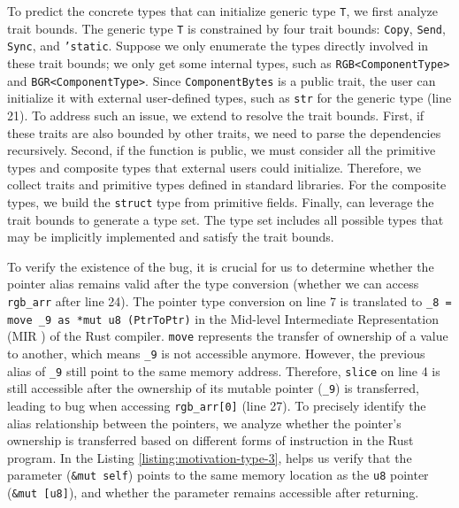 \vspace{0.05in}
 \label{motiv:generic-analysis}
{To predict the concrete types that can initialize generic type \texttt{T}, we first analyze trait bounds. The generic type \texttt{T}} is constrained by four trait bounds: \texttt{Copy}, \texttt{Send}, \texttt{Sync}, and \texttt{'static}.
Suppose we only enumerate the types directly involved in these trait bounds; we only get some internal types, such as \texttt{RGB<ComponentType>} and \texttt{BGR<ComponentType>}.
Since \texttt{ComponentBytes} is a public trait, the user can initialize it with external user-defined types, such as \texttt{str} for the generic type (line 21). 
To address such an issue, we extend {\it \analysisone} to {resolve the trait bounds}.
First, if these traits are also bounded by other traits, we need to parse the dependencies recursively.
Second, if the function is public,
we must consider all the primitive types and composite types that external users could
initialize. Therefore,
we collect traits and primitive types defined in standard libraries. {For the composite types, we build the \texttt{struct} type from primitive fields}. Finally, {\bugdetector can leverage the trait bounds to generate a type set. The type set includes all possible types that may be implicitly implemented and satisfy the trait bounds.}




\vspace{0.05in}
 \label{motiv:pointer-analysis}
{To verify the existence of the bug, it is crucial for us to determine whether the pointer alias remains valid after the type conversion (whether we can access \texttt{rgb\_arr} after line 24)}. 
The pointer type conversion on line 7 is translated to \texttt{\_8 = move \_9 as *mut u8 (PtrToPtr)} in the Mid-level Intermediate Representation (MIR \cite{MIR}) of the Rust compiler.
\texttt{move} represents the transfer of ownership of a value to another, which means \texttt{\_9} is not accessible anymore.
However, the previous alias of \texttt{\_9} still point to the same memory address.
Therefore, \texttt{slice} on line 4 is still accessible after the ownership of its mutable pointer (\texttt{\_9}) is transferred, leading to \bthree bug when accessing \texttt{rgb\_arr[0]} (line 27).
To precisely identify the alias relationship between the pointers, we analyze whether the pointer's ownership is transferred based on different forms of instruction in the Rust program.
In the Listing \ref{listing:motivation-type-3}, \analysistwo helps us verify that the parameter (\texttt{\&mut self}) points to the same memory location as the \texttt{u8} pointer (\texttt{\&mut [u8]}), and whether the parameter remains accessible after returning.





